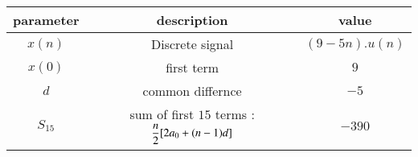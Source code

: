 \begin{tabular}{|c|c|c|}
\hline
     \textbf{parameter} & \textbf{description} & \textbf{value} \\
     \hline
     $x(n)$ & Discrete signal & $(9 -5n).u(n)$\\
     \hline
     $x(0)$ & first term & $9$\\
     \hline
     $d$ & common differnce & $-5$ \\
     \hline
     $S_{15}$ &  sum of first $15$ terms :$\dfrac{n}{2\vphantom{\brak{0.1}}} [2a_0 + (n-1)d]$ & $-390$ \\
     \hline
\end{tabular}
